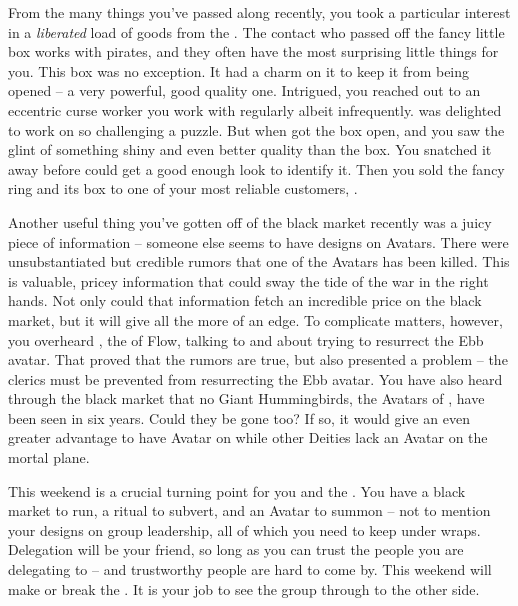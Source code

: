 \documentclass[char]{GL2020}
\begin{document}
From the many things you've passed along recently, you took a particular interest in a \emph{liberated} load of goods from the \pFarm{}. The contact who passed off the fancy little box works with pirates, and they often have the most surprising little things for you. This box was no exception. It had a charm on it to keep it from being opened -- a very powerful, good quality one. Intrigued, you reached out to an eccentric curse worker you work with regularly albeit infrequently. \cCurse{\full} was delighted to work on so challenging a puzzle. But when \cCurse{\they} got the box open, and you saw the glint of something shiny and even better quality than the box. You snatched it away before \cCurse{} could get a good enough look to identify it. Then you sold the fancy ring and its box to one of your most reliable customers, \cHedonist{\full}.

Another useful thing you've gotten off of the black market recently was a juicy piece of information -- someone else seems to have designs on Avatars. There were unsubstantiated but credible rumors that one of the \pShip{} Avatars has been killed. This is valuable, pricey information that could sway the tide of the war in the right hands. Not only could that information fetch an incredible price on the black market, but it will give \cGenesis{} all the more of an edge. To complicate matters, however, you overheard \cFlowPriest{\full}, the \cFlowPriest{\cleric} of Flow, talking to \cInitiate{\full} and \cWarlordDaughter{\full} about trying to resurrect the Ebb avatar. That proved that the rumors are true, but also presented a problem – the \pShip{} clerics must be prevented from resurrecting the Ebb avatar. You have also heard through the black market that no Giant Hummingbirds, the Avatars of \cFarmGod{}, have been seen in six years. Could they be gone too? If so, it would give \cGenesis{} an even greater advantage to have \cGenesis{\their} Avatar on \pEarth{} while other Deities lack an Avatar on the mortal plane.

This weekend is a crucial turning point for you and the \pGoaties{}. You have a black market to run, a ritual to subvert, and an Avatar to summon -- not to mention your designs on group leadership, all of which you need to keep under wraps. Delegation will be your friend, so long as you can trust the people you are delegating to -- and trustworthy people are hard to come by. This weekend will make or break the \pGoaties{}. It is your job to see the group through to the other side.
\end{document}

